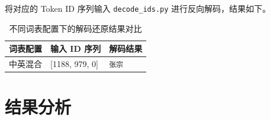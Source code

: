 \documentclass[a4paper,12pt]{ctexart} %
\begin{document}
将对应的 Token ID 序列输入 \texttt{decode\_ids.py} 进行反向解码，结果如下。

\begin{table}[H]
    \centering
    \begin{tabular}{p{} p{} p{}}
        \toprule
        词表配置 & 输入 ID 序列 & 解码结果 \\
        \midrule
        中英混合 & [1188, 979, 0] & \texttt{张宗 } \\
        \bottomrule
    \end{tabular}
    \caption{不同词表配置下的解码还原结果对比}
\end{table}



\section{结果分析}
\end{document}
